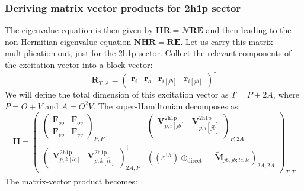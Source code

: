 \subsubsection{Deriving matrix vector products for 2h1p sector}
The eigenvalue equation is then given by $\bm{H} \bm{R} = \bm{\mathcal{N}} \bm{R} \bm{E}$ and then leading to the non-Hermitian eigenvalue equation $\mathcal{\bm{N}} \bm{H} \bm{R} = \bm{R} \bm{E}$.
Let us carry this matrix multiplication out, just for the 2h1p sector. Collect the relevant components of the excitation vector into a block vector:
\[
\bm{R}_{T,A} = 
\begin{pmatrix}
\bm{r}_i &\bm{r}_a &
\bm{r}_{i[jb]} &
\bm{\bar{r}}_{i[jb]}
\end{pmatrix}^\dag
\]
We will define the total dimension of this excitation vector as $T=P+2A$, where $P=O+V$ and $A=O^2V$.
The super-Hamiltonian decomposes as:
\[
\bm{H} =
\begin{pmatrix}
\begin{pmatrix}
    \bm{F}_{oo} & \bm{F}_{ov} \\
    \bm{F}_{vo} & \bm{F}_{vv}
\end{pmatrix}_{P,P} &
\begin{pmatrix}
    \bm{V}^{2 \mathrm{h1p}}_{p,i[jb]} & \bm{V}^{2 \mathrm{h1p}}_{p,i[\bar{jb}]} \\
\end{pmatrix}_{P,2A} \\ 
\begin{pmatrix}
    \bm{V}^{2 \mathrm{h1p}}_{p,k[lc]} & \bm{V}^{2 \mathrm{h1p}}_{p,k[\bar{lc}]}
\end{pmatrix}^\dagger_{2A,P} &
\left(\left(\varepsilon^{1h}\right) \oplus_{\text{direct}} -\bm{\tilde{M}}_{jb,jb;lc,lc}\right)_{2A,2A}
\end{pmatrix}_{T,T}
\] 
The matrix-vector product becomes:
